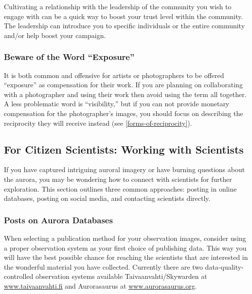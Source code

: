 \documentclass{article}
\newcommand{\contributed}[1]{%
    \par\noindent
    \begingroup
    \setlength{\leftskip}{1em}%
    \itshape
    Contributors: #1
    \par
    \endgroup
    \vspace{0.5em}
}
\begin{document}
Cultivating a relationship with the leadership of the community you wish to engage with can be a quick way to boost your trust level within the community. The leadership can introduce you to specific individuals or the entire community and/or help boost your campaign.

\subsubsection{Beware of the Word ``Exposure''}
It is both common and offensive for artists or photographers to be offered ``exposure'' as compensation for their work. If you are planning on collaborating with a photographer and using their work then avoid using the term all together. A less problematic word is ``visibility,'' but if you can not provide monetary compensation for the photographer's images, you should focus on describing the reciprocity they will receive instead (see \ref{forms-of-reciprocity}).

\subsection{For Citizen Scientists: Working with Scientists} 


If you have captured intriguing auroral imagery or have burning questions about the aurora, you may be wondering how to connect with scientists for further exploration. This section outlines three common approaches: posting in online databases, posting on social media, and contacting scientists directly.

\subsubsection{Posts on Aurora Databases} 

When selecting a publication method for your observation images, consider using a proper observation system as your first choice of publishing data. This way you will have the best possible chance for reaching the scientists that are interested in the wonderful material you have collected. Currently there are two data-quality-controlled observation systems available Taivaanvahti/Skywarden at \href{www.taivaanvahti.fi}{www.taivaanvahti.fi} and Aurorasaurus at \href{www.aurorasaurus.org}{www.aurorasaurus.org}.
\end{document}
